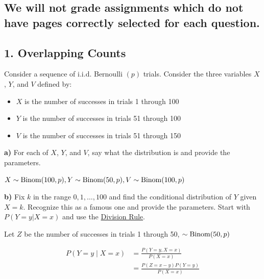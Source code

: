 \documentclass[11pt]{article}
\providecommand{\tightlist}{%
      \setlength{\itemsep}{0pt}\setlength{\parskip}{0pt}}
\begin{document}
\hypertarget{we-will-not-grade-assignments-which-do-not-have-pages-correctly-selected-for-each-question.}{%
\subsection{\texorpdfstring{\textbf{We will not grade assignments which
do not have pages correctly selected for each
question.}}{We will not grade assignments which do not have pages correctly selected for each question.}}\label{we-will-not-grade-assignments-which-do-not-have-pages-correctly-selected-for-each-question.}}

    \newpage

    \hypertarget{overlapping-counts}{%
\subsection{1. Overlapping Counts}\label{overlapping-counts}}

Consider a sequence of i.i.d. Bernoulli \((p)\) trials. Consider the
three variables \(X\), \(Y\), and \(V\) defined by:

\begin{itemize}
\tightlist
\item
  \(X\) is the number of successes in trials 1 through 100
\item
  \(Y\) is the number of successes in trials 51 through 100
\item
  \(V\) is the number of successes in trials 51 through 150
\end{itemize}

\textbf{a)} For each of \(X\), \(Y\), and \(V\), say what the
distribution is and provide the parameters.


$X \sim \operatorname{Binom}(100, p), Y \sim \operatorname{Binom}(50, p), V \sim \operatorname{Binom}(100, p) $ 



\textbf{b)} Fix \(k\) in the range \(0, 1, \ldots, 100\) and find the
conditional distribution of \(Y\) given \(X = k\). Recognize this as a
famous one and provide the parameters. Start with \(P(Y = y|X=x)\) and
use the
\href{https://data140.org/textbook/content/chapter-02/multiplication/\#division-rule}{Division
Rule}.


Let $Z$  be the number of successes in trials 1 through 50, $\sim \operatorname{Binom}(50, p)$ 

\begin{align*}
	P(Y=y \mid X = x) &= \frac{P(Y=y, X=x)}{P(X=x)} \\
&= \frac{P(Z = x-y)P(Y=y)}{P(X=x)} \\
\end{align*}
\end{document}
